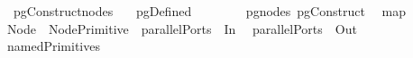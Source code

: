 \ pgConstruct{\isacharunderscore}nodes{\isacharcolon}\isanewline
\ \ \ {\isachardoublequoteopen}pgDefined\ \isanewline
\ \ \ \ \ \ \ pg{\isacharunderscore}nodes\ {\isacharparenleft}pgConstruct\ \ {\isacharequal}\isanewline
{}map\ {\isacharparenleft}{\isasymlambda}{\isacharparenleft}\ \ \ \ \isanewline
{}Node\ \ {\isacharparenleft}NodePrimitive\ \ {\isacharparenleft}parallelPorts\ {}\ In\ \ {\isacharat}\isanewline
{}parallelPorts\ {}\ Out\ \isanewline
{}namedPrimitives\ 
